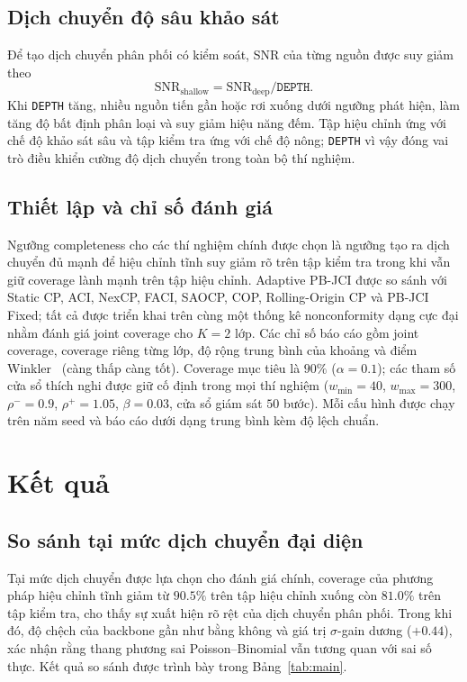 \documentclass[pdflatex,sn-mathphys-num]{sn-jnl}
\begin{document}
\subsection{Dịch chuyển độ sâu khảo sát}
Để tạo dịch chuyển phân phối có kiểm soát, SNR của từng nguồn được suy giảm theo
\[
\mathrm{SNR}_{\mathrm{shallow}}=\mathrm{SNR}_{\mathrm{deep}}/\texttt{DEPTH}.
\]
Khi \texttt{DEPTH} tăng, nhiều nguồn tiến gần hoặc rơi xuống dưới ngưỡng phát hiện, làm tăng độ bất định phân
loại và suy giảm hiệu năng đếm. Tập hiệu chỉnh ứng với chế độ khảo sát sâu và tập kiểm tra ứng với chế độ
nông; \texttt{DEPTH} vì vậy đóng vai trò điều khiển cường độ dịch chuyển trong toàn bộ thí nghiệm.

\subsection{Thiết lập và chỉ số đánh giá}
Ngưỡng completeness cho các thí nghiệm chính được chọn là ngưỡng tạo ra dịch chuyển đủ mạnh để hiệu chỉnh
tĩnh suy giảm rõ trên tập kiểm tra trong khi vẫn giữ coverage lành mạnh trên tập hiệu chỉnh. Adaptive PB-JCI
được so sánh với Static CP, ACI, NexCP, FACI, SAOCP, COP, Rolling-Origin CP và PB-JCI Fixed; tất cả được
triển khai trên cùng một thống kê nonconformity dạng cực đại nhằm đánh giá joint coverage cho $K{=}2$ lớp.
Các chỉ số báo cáo gồm joint coverage, coverage riêng từng lớp, độ rộng trung bình của khoảng và điểm
Winkler~\cite{winkler1972decision} (càng thấp càng tốt). Coverage mục tiêu là $90\%$ ($\alpha=0.1$); các tham
số cửa sổ thích nghi được giữ cố định trong mọi thí nghiệm ($w_{\min}=40$, $w_{\max}=300$, $\rho^{-}=0.9$,
$\rho^{+}=1.05$, $\beta=0.03$, cửa sổ giám sát $50$ bước). Mỗi cấu hình được chạy trên năm seed và báo cáo
dưới dạng trung bình kèm độ lệch chuẩn.

\section{Kết quả}\label{sec:results}

\subsection{So sánh tại mức dịch chuyển đại diện}
Tại mức dịch chuyển được lựa chọn cho đánh giá chính, coverage của phương pháp hiệu chỉnh tĩnh giảm từ
$90.5\%$ trên tập hiệu chỉnh xuống còn $81.0\%$ trên tập kiểm tra, cho thấy sự xuất hiện rõ rệt của dịch
chuyển phân phối. Trong khi đó, độ chệch của backbone gần như bằng không và giá trị $\sigma$-gain dương
($+0.44$), xác nhận rằng thang phương sai Poisson--Binomial vẫn tương quan với sai số thực. Kết quả so sánh
được trình bày trong Bảng~\ref{tab:main}.
\end{document}

